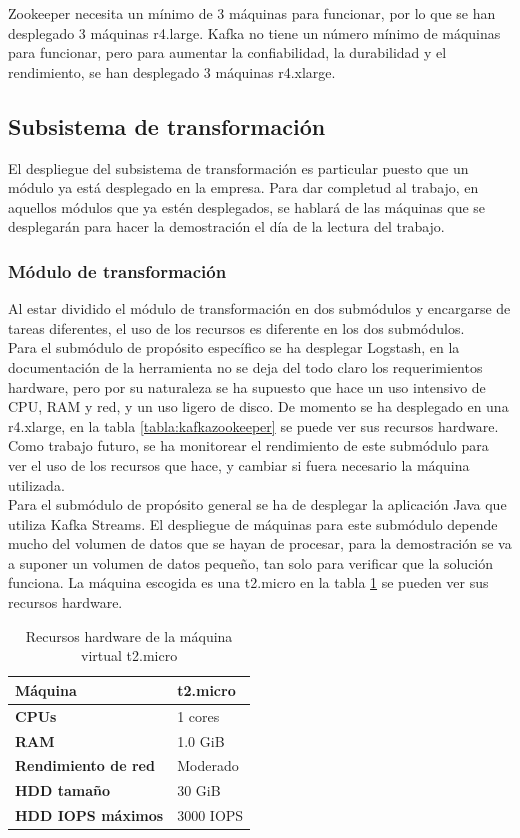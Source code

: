Zookeeper necesita un mínimo de 3 máquinas para funcionar, por lo que se han desplegado 3 máquinas r4.large.
Kafka no tiene un número mínimo de máquinas para funcionar, pero para aumentar la confiabilidad, la durabilidad y el rendimiento, se han desplegado 3 máquinas r4.xlarge.

\subsection{Subsistema de transformación}
El despliegue del subsistema de transformación es particular puesto que un módulo ya está desplegado en la empresa. Para dar completud al trabajo, en aquellos módulos que ya estén desplegados, se hablará de las máquinas que se desplegarán para hacer la demostración el día de la lectura del trabajo.

\subsubsection{Módulo de transformación}
Al estar dividido el módulo de transformación en dos submódulos y encargarse de tareas diferentes, el uso de los recursos es diferente en los dos submódulos. 
\\
Para el submódulo de propósito específico se ha desplegar Logstash, en la documentación de la herramienta no se deja del todo claro los requerimientos hardware\cite{Tfg:logstashdeploy}, pero por su naturaleza se ha supuesto que hace un uso intensivo de CPU, RAM y red, y un uso ligero de disco. De momento se ha desplegado en una r4.xlarge, en la tabla \ref{tabla:kafkazookeeper} se puede ver sus recursos hardware. Como trabajo futuro, se ha monitorear el rendimiento de este submódulo para ver el uso de los recursos que hace, y cambiar si fuera necesario la máquina utilizada.
\\
Para el submódulo de propósito general se ha de desplegar la aplicación Java que utiliza Kafka Streams. El despliegue de máquinas para este submódulo depende mucho del volumen de datos que se hayan de procesar, para la demostración se va a suponer un volumen de datos pequeño, tan solo para verificar que la solución funciona. La máquina escogida es una t2.micro en la tabla \ref{tabla:t2.micro} se pueden ver sus recursos hardware.

\begin{table}[H]\label{tabla:t2.micro}
	\centering
	\begin{tabular}{|l|l|}
		\hline
		\textbf{Máquina}            & \textbf{t2.micro}      \\ \hline
		\textbf{CPUs}               & 1 cores                \\ \hline
		\textbf{RAM}                & 1.0 GiB                \\ \hline
		\textbf{Rendimiento de red} & Moderado               \\ \hline
		\textbf{HDD tamaño}         & 30 GiB                 \\ \hline
		\textbf{HDD IOPS máximos}   & 3000 IOPS              \\ \hline
	\end{tabular}
	\caption{Recursos hardware de la máquina virtual t2.micro}
\end{table}

